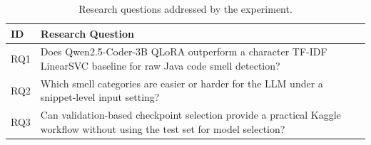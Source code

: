 \begin{table}[H]
\centering
\small
\begin{tabular}{@{}lP{0.68\textwidth}@{}}
\toprule
ID & Research Question \\
\midrule
RQ1 & Does Qwen2.5-Coder-3B QLoRA outperform a character TF-IDF LinearSVC baseline for raw Java code smell detection? \\
RQ2 & Which smell categories are easier or harder for the LLM under a snippet-level input setting? \\
RQ3 & Can validation-based checkpoint selection provide a practical Kaggle workflow without using the test set for model selection? \\
\bottomrule
\end{tabular}
\caption{Research questions addressed by the experiment.}
\label{tab:research-questions}
\end{table}
